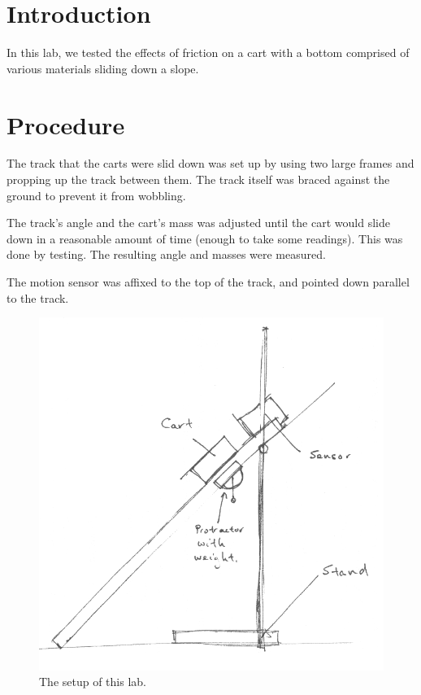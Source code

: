 \section{Introduction}

In this lab, we tested the effects of friction on a cart with a bottom comprised of various materials sliding down a slope.

\section{Procedure}

The track that the carts were slid down was set up by using two large frames and propping up the track between them.
The track itself was braced against the ground to prevent it from wobbling.

The track's angle and the cart's mass was adjusted until the cart would slide down in a reasonable amount of time (enough to take some readings).
This was done by testing.
The resulting angle and masses were measured.

The motion sensor was affixed to the top of the track, and pointed down parallel to the track.

\begin{figure}[h]

\begin{center}
\includegraphics[scale=0.3]{content/fig1}
\end{center}

\caption{The setup of this lab.}

\end{figure}

